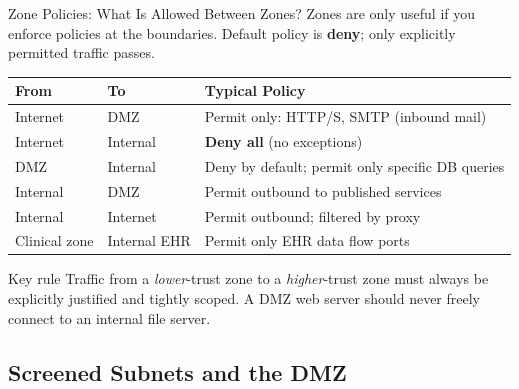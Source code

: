 \documentclass[aspectratio=169]{beamer}  %
\begin{document}
\begin{frame}{Zone Policies: What Is Allowed Between Zones?}
    \footnotesize
    Zones are only useful if you enforce policies at the boundaries. Default policy is \textbf{deny}; only explicitly permitted traffic passes.

    \vspace{0.3em}
    \begin{table}[]
        \renewcommand{\arraystretch}{1.3}
        \centering
        \small
        \begin{tabular}{|l|l|l|}
        \hline
        \rowcolor[HTML]{EFEFEF} \textbf{From} & \textbf{To} & \textbf{Typical Policy} \\ \hline
        Internet & DMZ & Permit only: HTTP/S, SMTP (inbound mail) \\ \hline
        Internet & Internal & \textbf{Deny all} (no exceptions) \\ \hline
        DMZ & Internal & Deny by default; permit only specific DB queries \\ \hline
        Internal & DMZ & Permit outbound to published services \\ \hline
        Internal & Internet & Permit outbound; filtered by proxy \\ \hline
        Clinical zone & Internal EHR & Permit only EHR data flow ports \\ \hline
        \end{tabular}
    \end{table}

    \begin{block}{Key rule}
        \footnotesize
        Traffic from a \emph{lower}-trust zone to a \emph{higher}-trust zone must always be explicitly justified and tightly scoped. A DMZ web server should never freely connect to an internal file server.
    \end{block}
\end{frame}

\subsection{Screened Subnets and the DMZ}
\end{document}
